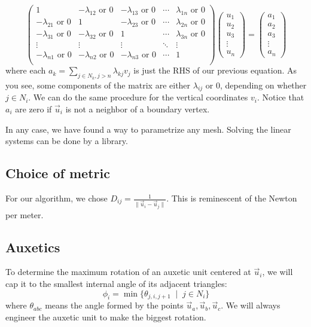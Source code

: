 \documentclass{article}
\begin{document}
$$\begin{pmatrix}
  1 & -\lambda_{12} \text{ or 0} & -\lambda_{13} \text{ or 0} & \cdots & \lambda_{1n} \text{ or 0} \\
  -\lambda_{21} \text{ or 0} & 1 & -\lambda_{23} \text{ or 0} & \cdots & \lambda_{2n} \text{ or 0} \\
  -\lambda_{31} \text{ or 0} & -\lambda_{32} \text{ or 0} & 1 & \cdots & \lambda_{3n} \text{ or 0} \\
  \vdots & \vdots & \vdots & \ddots & \vdots \\
  -\lambda_{n1} \text{ or 0} & -\lambda_{n2} \text{ or 0} & -\lambda_{n3} \text{ or 0} & \cdots & 1\\
\end{pmatrix}
\begin{pmatrix}
  u_1 \\
  u_2 \\
  u_3 \\
  \vdots \\
  u_n
\end{pmatrix}
= \begin{pmatrix}
  a_1 \\
  a_2 \\
  a_3 \\
  \vdots \\
  a_n
\end{pmatrix}$$
where each $a_k = \sum_{j \in N_k, j > n} \lambda_{kj} v_j$ is just the RHS of our previous equation. As you see, some components of the matrix are either $\lambda_{ij}$ or $0$, depending on whether $j \in N_i$. We can do the same procedure for the vertical coordinates $v_i$. Notice that $a_i$ are zero if $\vec{u}_i$ is not a neighbor of a boundary vertex.

In any case, we have found a way to parametrize any mesh. \cite{meshparam} Solving the linear systems can be done by a library.

\subsection{Choice of metric}
For our algorithm, we chose $D_{ij} = \frac{1}{\lVert \vec{u}_i - \vec{u}_j \rVert}$. This is reminescent of the Newton per meter.

\subsection{Auxetics}
To determine the maximum rotation of an auxetic unit centered at $\vec{u}_i$, we will cap it to the smallest internal angle of its adjacent triangles:
$$\phi_i = \min\{\theta_{j, i, j + 1} \; \mid \; j \in N_i\}$$
where $\theta_{abc}$ means the angle formed by the points $\vec{u}_a, \vec{u}_b, \vec{u}_c$. We will always engineer the auxetic unit to make the biggest rotation.
\end{document}

